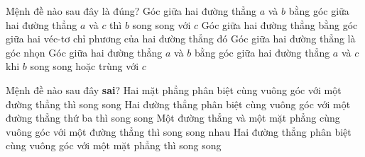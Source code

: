 	\begin{ex}%
		Mệnh đề nào sau đây là đúng?
		\choice
		{Góc giữa hai đường thẳng $a$ và $b$ bằng góc giữa hai đường thẳng $a$ và $c$ thì $b$ song song với $c$}
		{Góc giữa hai đường thẳng bằng góc giữa hai véc-tơ chỉ phương của hai đường thẳng đó}
		{Góc giữa hai đường thẳng là góc nhọn}
		{\True Góc giữa hai đường thẳng $a$ và $b$ bằng góc giữa hai đường thẳng $a$ và $c$ khi $b$ song song hoặc trùng với $c$}
	\end{ex}
	
	\begin{ex}%
		Mệnh đề nào sau đây \textbf{sai}?
		\choice 
		{ Hai mặt phẳng phân biệt cùng vuông góc với một đường thẳng thì song song} 
		{\True Hai đường thẳng phân biệt cùng vuông góc với một đường thẳng thứ ba thì song song} 
		{ Một đường thẳng và một mặt phẳng cùng vuông góc với một đường thẳng thì song song nhau} 
		{ Hai đường thẳng phân biệt cùng vuông góc với một mặt phẳng thì song song	}
	\end{ex}
	
